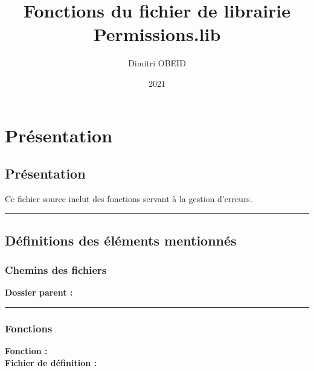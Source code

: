 \documentclass[a4paper,10pt]{article}
\title{\color{sec1}Fonctions du fichier de librairie \color{path}Permissions.lib}\color{text}
\author{Dimitri OBEID}
\date{2021}
\begin{document}
 \maketitle
 \tableofcontents
 \newpage

\color{sec1}
\section{Présentation}\color{text}

\color{sec2}
\subsection{Présentation}\color{text}
Ce fichier source inclut des fonctions servant à la gestion d'erreurs.\\[1\baselineskip]




\color{sec2}\par\noindent\rule{\textwidth}{0.4pt}\color{text}

\color{sec2}
\subsection{Définitions des éléments mentionnés}\color{text}

\color{sec3}
\subsubsection{Chemins des fichiers}\color{text}

\textbf{Dossier parent :} \textbf{\color{path}\color{text}}\\[1\baselineskip]



\color{sec3}\par\noindent\rule{\textwidth}{0.4pt}\color{text}

\color{sec3}
\subsubsection{Fonctions}\color{text}

\textbf{Fonction :} \textbf{\color{mauve}\color{text}}\\[1\baselineskip]

\textbf{Fichier de définition :} \textbf{\color{path}\color{text}}\\[1\baselineskip]
\end{document}
